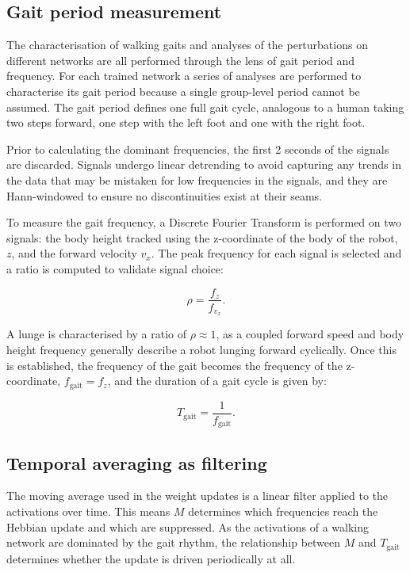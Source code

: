 \documentclass{article} %
\begin{document}
\subsection{Gait period measurement}
\label{subsec:gait_period_measurement}

The characterisation of walking gaits and analyses of the perturbations on different networks are all performed through the lens of gait period and frequency. For each trained network a series of analyses are performed to characterise its gait period because a single group-level period cannot be assumed. The gait period defines one full gait cycle, analogous to a human taking two steps forward, one step with the left foot and one with the right foot.

Prior to calculating the dominant frequencies, the first 2 seconds of the signals are discarded. Signals undergo linear detrending to avoid capturing any trends in the data that may be mistaken for low frequencies in the signals, and they are Hann-windowed to ensure no discontinuities exist at their seams. 

To measure the gait frequency, a Discrete Fourier Transform is performed on two signals: the body height tracked using the z-coordinate of the body of the robot, $z$, and the forward velocity ${v_x}$. The peak frequency for each signal is selected and a ratio is computed to validate signal choice:

\begin{equation}
\rho = \frac{f_z}{f_{v_x}}.
\label{eq:gait-ratio}
\end{equation}

A lunge is characterised by a ratio of $\rho \approx 1$, as a coupled forward speed and body height frequency generally describe a robot lunging forward cyclically. Once this is established, the frequency of the gait becomes the frequency of the z-coordinate, $f_{\text{gait}} = f_z$, and the duration of a gait cycle is given by:

\begin{equation}
T_{\text{gait}} = {\frac{1}{f_{\text{gait}}}}.  
\label{eq:gait-time}
\end{equation}

\subsection{Temporal averaging as filtering}
\label{sec:temporak_filtering}

The moving average used in the weight updates is a linear filter applied to the
activations over time. This means $M$ determines which frequencies reach the
Hebbian update and which are suppressed. As the activations of a walking
network are dominated by the gait rhythm, the relationship between $M$ and
$T_{\text{gait}}$ determines whether the update is driven periodically at all.
\end{document}
